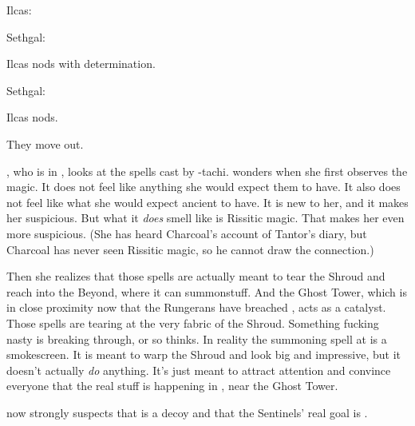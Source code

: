Ilcas:

Sethgal:

Ilcas nods with determination.

Sethgal:

Ilcas nods.

They move out. 





\begin{comment}
  \subsection{\Achsah suspects \Takestsha}
\end{comment}
\new
\Achsah, who is in \Forclin, looks at the \quo{\EreshKali} spells cast by \Takestsha-tachi. 
\Achsah{} wonders when she first observes the \EreshKali{} magic. 
It does not feel like anything she would expect them to have. 
It also does not feel like what she would expect ancient \meccara{} to have. 
It is new to her, and it makes her suspicious. 
But what it \emph{does} smell like is Rissitic magic. 
That makes her even more suspicious. 
(She has heard Charcoal's account of Tantor's diary, but Charcoal has never seen Rissitic magic, so he cannot draw the connection.) 

Then she realizes that those spells are actually meant to tear the Shroud and reach into the Beyond, where it can summon\prikker stuff. 
And the Ghost Tower, which is in close proximity now that the Rungerans have breached \Forclin, acts as a catalyst. 
Those spells are tearing at the very fabric of the Shroud. 
Something fucking nasty is breaking through, or so \Achsah thinks. 
In reality the summoning spell at \Forclin is a smokescreen. 
It is meant to warp the Shroud and look big and impressive, but it doesn't actually \emph{do} anything. 
It's just meant to attract attention and convince everyone that the real stuff is happening in \Forclin, near the Ghost Tower. 

\Achsah now strongly suspects that \Malcur is a decoy and that the Sentinels' real goal is \Forclin. 

